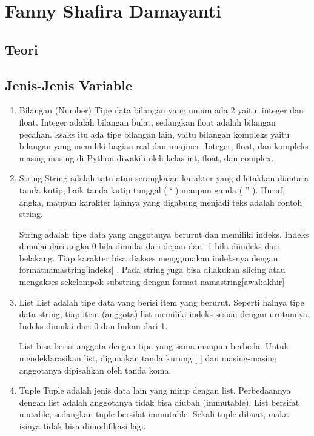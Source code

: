 \section{Fanny Shafira Damayanti}
\subsection{Teori}
\subsection{Jenis-Jenis Variable}
\begin{enumerate}
\item Bilangan (Number)
Tipe data bilangan yang umum ada 2 yaitu, integer dan float. Integer adalah bilangan bulat, sedangkan float adalah bilangan pecahan. ksaks itu ada tipe bilangan lain, yaitu bilangan kompleks yaitu bilangan yang memiliki bagian real dan imajiner. Integer, float, dan kompleks masing-masing di Python diwakili oleh kelas int, float, dan complex.

\item String
String adalah satu atau serangkaian karakter yang diletakkan diantara tanda kutip, baik tanda kutip tunggal ( ‘ ) maupun ganda ( ” ). Huruf, angka, maupun karakter lainnya yang digabung menjadi teks adalah contoh string.

String adalah tipe data yang anggotanya berurut dan memiliki indeks. Indeks dimulai dari angka 0 bila dimulai dari depan dan -1 bila diindeks dari belakang. Tiap karakter bisa diakses menggunakan indeksnya dengan formatnamastring[indeks] . Pada string juga bisa dilakukan slicing atau mengakses sekelompok substring dengan format namastring[awal:akhir]

\item List
List adalah tipe data yang berisi item yang berurut. Seperti halnya tipe data string, tiap item (anggota) list memiliki indeks sesuai dengan urutannya. Indeks dimulai dari 0 dan bukan dari 1.

List bisa berisi anggota dengan tipe yang sama maupun berbeda. Untuk mendeklarasikan list, digunakan tanda kurung [ ] dan masing-masing anggotanya dipisahkan oleh tanda koma.

\item Tuple
Tuple adalah jenis data lain yang mirip dengan list. Perbedaannya dengan list adalah anggotanya tidak bisa diubah (immutable). List bersifat mutable, sedangkan tuple bersifat immutable. Sekali tuple dibuat, maka isinya tidak bisa dimodifikasi lagi.


\end{enumerate}
